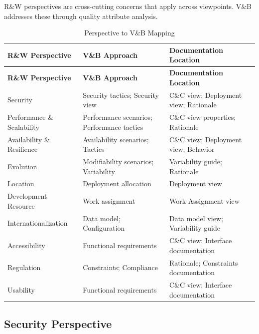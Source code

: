 \documentclass[11pt]{article}
\begin{document}
R\&W perspectives are cross-cutting concerns that apply across viewpoints. V\&B addresses these through quality attribute analysis.

\begin{longtable}{@{}L{3cm} L{4cm} L{5.5cm}@{}}
\caption{Perspective to V\&B Mapping} \\
\toprule
\textbf{R\&W Perspective} & \textbf{V\&B Approach} & \textbf{Documentation Location} \\
\midrule
\endfirsthead
\toprule
\textbf{R\&W Perspective} & \textbf{V\&B Approach} & \textbf{Documentation Location} \\
\midrule
\endhead
\bottomrule
\endlastfoot
Security & Security tactics; Security view & C\&C view; Deployment view; Rationale \\
Performance \& Scalability & Performance scenarios; Performance tactics & C\&C view properties; Rationale \\
Availability \& Resilience & Availability scenarios; Tactics & C\&C view; Deployment view; Behavior \\
Evolution & Modifiability scenarios; Variability & Variability guide; Rationale \\
Location & Deployment allocation & Deployment view \\
Development Resource & Work assignment & Work Assignment view \\
Internationalization & Data model; Configuration & Data model view; Variability guide \\
Accessibility & Functional requirements & C\&C view; Interface documentation \\
Regulation & Constraints; Compliance & Rationale; Constraints documentation \\
Usability & Functional requirements & C\&C view; Interface documentation \\
\end{longtable}

\subsection{Security Perspective}
\end{document}
